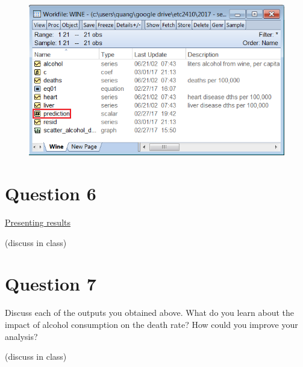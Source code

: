 \documentclass[12pt]{report}
\begin{document}
		\begin{figure}[H]
			\centering
			\includegraphics{pred2}
		\end{figure}
		\vspace{-\baselineskip}
		
	\section*{Question 6}
	\underline{Presenting results} \par
		\noindent (discuss in class)
	
	\section*{Question 7}
		\noindent Discuss each of the outputs you obtained above. What do you learn about the impact of alcohol consumption on the death rate? How could you improve your analysis?
		
		\noindent (discuss in class)
		
\end{document}
